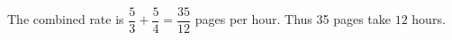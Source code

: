 The combined rate is $\dfrac{5}{3}+\dfrac{5}{4}=\dfrac{35}{12}$ pages per hour. Thus 35 pages take $\boxed{12}$ hours.
